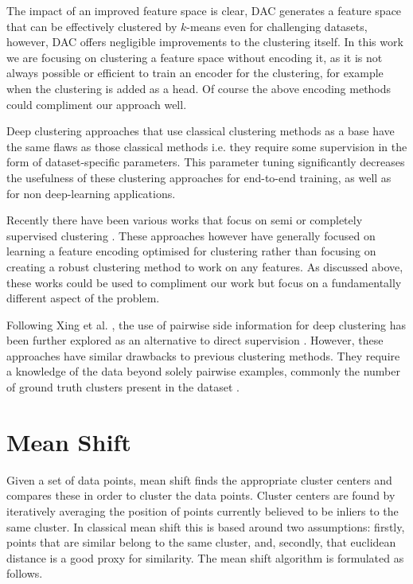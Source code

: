 \documentclass[letterpaper, 11pt]{IEEEtran}
\begin{document}
The impact of an improved feature space is clear, DAC \cite{Chang2017} generates a feature space that can be effectively clustered by $k$-means even for challenging datasets, however, DAC offers negligible improvements to the clustering itself. In this work we are focusing on clustering a feature space without encoding it, as it is not always possible or efficient to train an encoder for the clustering, for example when the clustering is added as a head. Of course the above encoding methods could compliment our approach well.

Deep clustering approaches that use classical clustering methods as a base have the same flaws as those classical methods i.e. they require some supervision in the form of dataset-specific parameters. This parameter tuning significantly decreases the usefulness of these clustering approaches for end-to-end training, as well as for non deep-learning applications.

Recently there have been various works that focus on semi or completely supervised clustering \cite{Hsu2015,Fogel2019,Kong2018,unknown}. These approaches however have generally focused on learning a feature encoding optimised for clustering rather than focusing on creating a robust clustering method to work on any features. As discussed above, these works could be used to compliment our work but focus on a fundamentally different aspect of the problem. 

Following Xing et al. \cite{Xing}, the use of pairwise side information for deep clustering has been further explored as an alternative to direct supervision \cite{han2020automatically,Liu2015,Hsu2015,Li2018,Mazumdar2017}. However, these approaches have similar drawbacks to previous clustering methods. They require a knowledge of the data beyond solely pairwise examples, commonly the number of ground truth clusters present in the dataset \cite{han2020automatically,Hsu2015,Liu2015}.

\section{Mean Shift}\label{meanshift}

Given a set of data points, mean shift \cite{Fukunaga1975} finds the appropriate cluster centers and compares these in order to cluster the data points. Cluster centers are found by iteratively averaging the position of points currently believed to be inliers to the same cluster.
In classical mean shift this is based around two assumptions: firstly, points that are similar belong to the same cluster, and, secondly, that euclidean distance is a good proxy for similarity.
The mean shift algorithm is formulated as follows.
\end{document}
